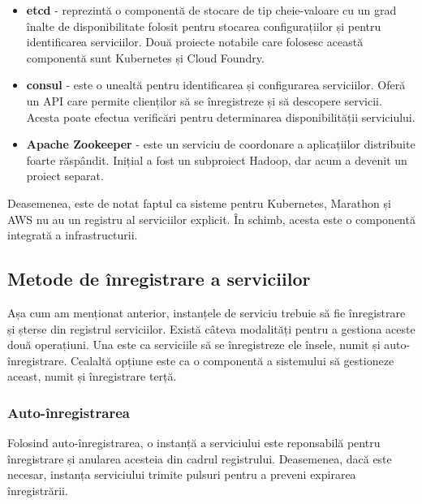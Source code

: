 \documentclass[12pt, a4paper, oneside, romanian]{teza-upb}
\begin{document}
\begin{itemize}
 \item \textbf{etcd} - reprezintă o componentă de stocare de tip cheie-valoare cu un grad înalte de disponibilitate folosit pentru stocarea configurațiilor și pentru identificarea serviciilor. Două proiecte notabile care folosesc această componentă sunt Kubernetes și Cloud Foundry. 
 \item \textbf{consul} - este o unealtă pentru identificarea și configurarea serviciilor. Oferă un API care permite clienților să se înregistreze și să descopere servicii. Acesta poate efectua verificări pentru determinarea disponibilității serviciului. 
 \item \textbf{Apache Zookeeper} - este un serviciu de coordonare a aplicațiilor distribuite foarte răspândit. Inițial a fost un subproiect Hadoop, dar acum a devenit un proiect separat. 
\end{itemize}

Deasemenea, este de notat faptul ca sisteme pentru Kubernetes, Marathon și AWS nu au un registru al serviciilor explicit. În schimb, acesta este o componentă integrată a infrastructurii.

\newpage
\subsection{Metode de înregistrare a serviciilor}

Așa cum am menționat anterior, instanțele de serviciu trebuie să fie înregistrare și șterse din registrul serviciilor. Există câteva modalități pentru a gestiona aceste două operațiuni. Una este ca serviciile să se înregistreze ele însele, numit și auto-înregistrare. Cealaltă opțiune este ca o componentă a sistemului să gestioneze aceast, numit și înregistrare terță.

\subsubsection{Auto-înregistrarea}
Folosind auto-înregistrarea, o instanță a serviciului este reponsabilă pentru înregistrare și anularea acesteia din cadrul registrului. Deasemenea, dacă este necesar, instanța serviciului trimite pulsuri pentru a preveni expirarea înregistrării.
\end{document}
